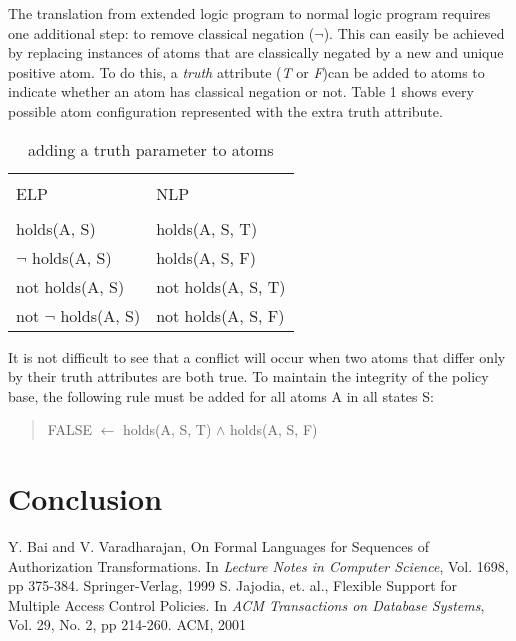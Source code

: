 \documentclass{llncs}
\begin{document}
        The translation from extended logic program to normal logic program
        requires one additional step: to remove classical negation ($\lnot$).
        This can easily be achieved by replacing instances of atoms that are
        classically negated by a new and unique positive atom. To do this,
        a \emph{truth} attribute (\emph{T} or \emph{F})can be added to atoms
        to indicate whether an atom has classical negation or not. Table 1 shows
        every possible atom configuration represented with the extra truth
        attribute.

        \begin{table}
         \caption{adding a truth parameter to atoms}
          \begin{tabular}{ll}
            \hline \\
            ELP & NLP \\
            \hline \\
            holds(A, S) & holds(A, S, T) \\
            $\lnot$ holds(A, S) & holds(A, S, F) \\
            not holds(A, S) & not holds(A, S, T) \\
            not $\lnot$ holds(A, S) & not holds(A, S, F) \\
            \hline
          \end{tabular}
        \end{table}

        It is not difficult to see that a conflict will occur when two atoms
        that differ only by their truth attributes are both true. To maintain
        the integrity of the policy base, the following rule must be added 
        for all atoms A in all states S:

        \begin{quote}
          FALSE $\leftarrow$ holds(A, S, T) $\land$ holds(A, S, F)
        \end{quote}

  \section{Conclusion}

  \begin{thebibliography}{5}

      Y. Bai and V. Varadharajan,
      On Formal Languages for Sequences of Authorization Transformations.
      In \emph{Lecture Notes in Computer Science},
      Vol. 1698,
      pp 375-384.
      Springer-Verlag, 1999
      S. Jajodia, et. al.,
      Flexible Support for Multiple Access Control Policies.
      In \emph{ACM Transactions on Database Systems},
      Vol. 29, No. 2,
      pp 214-260.
      ACM, 2001
      

  \end{thebibliography}
\end{document}
